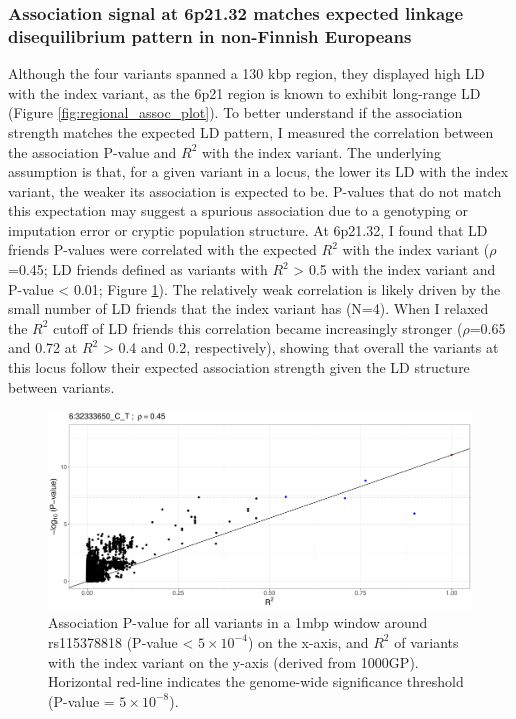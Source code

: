     \subsubsection{Association signal at 6p21.32 matches expected linkage disequilibrium pattern in non-Finnish Europeans}
    Although the four variants spanned a 130 kbp region, they displayed high LD with the index variant, as the 6p21 region is known to exhibit long-range LD (Figure \ref{fig:regional_assoc_plot}). To better understand if the association strength matches the expected LD pattern, I measured the correlation between the association P-value and $R^{2}$ with the index variant. The underlying assumption is that, for a given variant in a locus, the lower its LD with the index variant, the weaker its association is expected to be. P-values that do not match this expectation may suggest a spurious association due to a genotyping or imputation error or cryptic population structure. At 6p21.32, I found that LD friends P-values were correlated with the expected $R^{2}$ with the index variant ($\rho$=0.45; LD friends defined as variants with $R^{2}$ > 0.5 with the index variant and P-value < 0.01; Figure \ref{fig:ld_pval_plot}). The relatively weak correlation is likely driven by the small number of LD friends that the index variant has (N=4). When I relaxed the $R^{2}$ cutoff of LD friends this correlation became increasingly stronger ($\rho$=0.65 and 0.72 at $R^{2}$ > 0.4 and 0.2, respectively), showing that overall the variants at this locus follow their expected association strength given the LD structure between variants. 




    \begin{figure}[H] 
      \centering    
      \includegraphics[width=1.0\textwidth]{fig3}
      \caption[LD decay plot of the 6p21.32 locus]{Association P-value for all variants in a 1mbp window around rs115378818 (P-value < $5\times10^{-4}$) on the x-axis, and $R^{2}$ of variants with the index variant on the y-axis (derived from 1000GP). Horizontal red-line indicates the genome-wide significance threshold (P-value = $5\times10^{-8}$).}
      \label{fig:ld_pval_plot}
      \end{figure}


